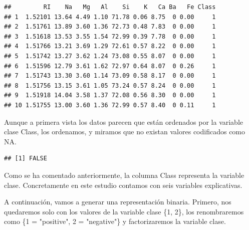 \documentclass[]{article}
\newenvironment{Shaded}{\begin{snugshade}}{\end{snugshade}}
\newcommand{\ControlFlowTok}[1]{\textcolor[rgb]{0.13,0.29,0.53}{\textbf{#1}}}
\newcommand{\DecValTok}[1]{\textcolor[rgb]{0.00,0.00,0.81}{#1}}
\newcommand{\KeywordTok}[1]{\textcolor[rgb]{0.13,0.29,0.53}{\textbf{#1}}}
\newcommand{\NormalTok}[1]{#1}
\newcommand{\OperatorTok}[1]{\textcolor[rgb]{0.81,0.36,0.00}{\textbf{#1}}}
\newcommand{\StringTok}[1]{\textcolor[rgb]{0.31,0.60,0.02}{#1}}
\begin{document}
\begin{verbatim}
##         RI    Na   Mg   Al    Si    K   Ca Ba   Fe Class
## 1  1.52101 13.64 4.49 1.10 71.78 0.06 8.75  0 0.00     1
## 2  1.51761 13.89 3.60 1.36 72.73 0.48 7.83  0 0.00     1
## 3  1.51618 13.53 3.55 1.54 72.99 0.39 7.78  0 0.00     1
## 4  1.51766 13.21 3.69 1.29 72.61 0.57 8.22  0 0.00     1
## 5  1.51742 13.27 3.62 1.24 73.08 0.55 8.07  0 0.00     1
## 6  1.51596 12.79 3.61 1.62 72.97 0.64 8.07  0 0.26     1
## 7  1.51743 13.30 3.60 1.14 73.09 0.58 8.17  0 0.00     1
## 8  1.51756 13.15 3.61 1.05 73.24 0.57 8.24  0 0.00     1
## 9  1.51918 14.04 3.58 1.37 72.08 0.56 8.30  0 0.00     1
## 10 1.51755 13.00 3.60 1.36 72.99 0.57 8.40  0 0.11     1
\end{verbatim}

Aunque a primera vista los datos parecen que están ordenados por la variable clase Class, los ordenamos, y miramos que no existan valores codificados como NA.

\begin{Shaded}
\end{Shaded}

\begin{verbatim}
## [1] FALSE
\end{verbatim}

Como se ha comentado anteriormente, la columna Class representa la variable clase. Concretamente en este estudio contamos con seis variables explicativas.

A continuación, vamos a generar una representación binaria. Primero, nos quedaremos solo con los valores de la variable clase \{1, 2\}, los renombraremos como \{1 = "positive", 2 = "negative"\} y factorizaremos la variable clase.

\newpage

\begin{Shaded}
\end{Shaded}
\end{document}
